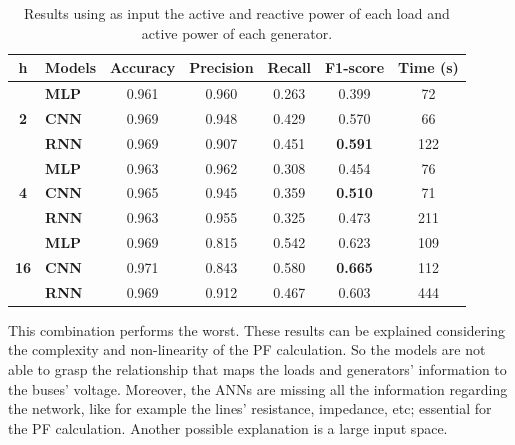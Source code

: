 \begin{itemize}
   \begin{table}[H]
    \centering
    \begin{tabular}{|c|l|c|c|c|c|c|}
    \hline
    \textbf{h} &
      \textbf{Models} &
      \multicolumn{1}{l|}{\textbf{Accuracy}} &
      \multicolumn{1}{l|}{\textbf{Precision}} &
      \multicolumn{1}{l|}{\textbf{Recall}} &
      \multicolumn{1}{l|}{\textbf{F1-score}} &
      \multicolumn{1}{l|}{\textbf{Time (s)}} \\ \hline
    \multirow{3}{*}{\textbf{2}}  & \textbf{MLP} & 0.961 & 0.960 & 0.263 & 0.399          & 72  \\ \cline{2-7} 
                                 & \textbf{CNN} & 0.969 & 0.948 & 0.429 & 0.570          & 66  \\ \cline{2-7} 
                                 & \textbf{RNN} & 0.969 & 0.907 & 0.451 & \textbf{0.591} & 122 \\ \hline
    \multirow{3}{*}{\textbf{4}}  & \textbf{MLP} & 0.963 & 0.962 & 0.308 & 0.454          & 76  \\ \cline{2-7} 
                                 & \textbf{CNN} & 0.965 & 0.945 & 0.359 & \textbf{0.510} & 71  \\ \cline{2-7} 
                                 & \textbf{RNN} & 0.963 & 0.955 & 0.325 & 0.473          & 211 \\ \hline
    \multirow{3}{*}{\textbf{16}} & \textbf{MLP} & 0.969 & 0.815 & 0.542 & 0.623          & 109 \\ \cline{2-7} 
                                 & \textbf{CNN} & 0.971 & 0.843 & 0.580 & \textbf{0.665} & 112 \\ \cline{2-7} 
                                 & \textbf{RNN} & 0.969 & 0.912 & 0.467 & 0.603          & 444 \\ \hline
    \end{tabular}%
    \caption[Models' results using loads and generators information]{Results using as input the active and reactive power of each load and active power of each generator.}
    \end{table}
    This combination performs the worst. These results can be explained considering the complexity and non-linearity of the \gls{PF} calculation. So the models are not able to grasp the relationship that maps the loads and generators' information to the buses' voltage. Moreover, the \glspl{ANN} are missing all the information regarding the network, like for example the lines' resistance, impedance, etc; essential for the \gls{PF} calculation. Another possible explanation is a large input space.
    

\end{itemize}
